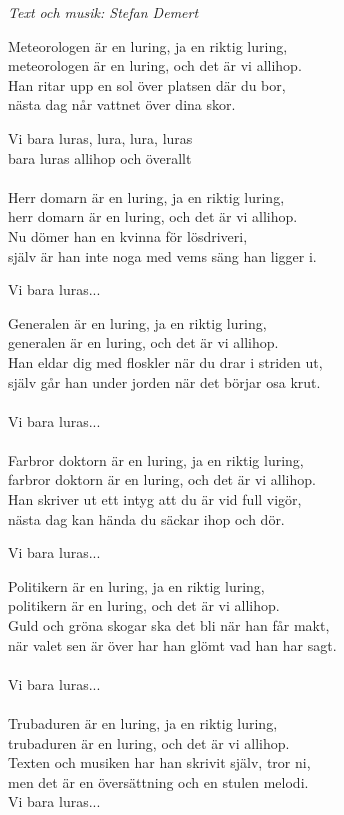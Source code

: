 {\footnotesize\textit{Text och musik: Stefan Demert}}\par
\vspace{10pt}
Meteorologen är en luring, ja en riktig luring,\\
meteorologen är en luring, och det är vi allihop.\\
Han ritar upp en sol över platsen där du bor,\\
nästa dag når vattnet över dina skor.\par
\vspace{10pt}
Vi bara luras, lura, lura, luras\\
bara luras allihop och överallt\\
\\
Herr domarn är en luring, ja en riktig luring,\\
herr domarn är en luring, och det är vi allihop.\\
Nu dömer han en kvinna för lösdriveri,\\
själv är han inte noga med vems säng han ligger i.\par
\vspace{10pt}
Vi bara luras...\par
\vspace{10pt}
Generalen är en luring, ja en riktig luring,\\
generalen är en luring, och det är vi allihop.\\
Han eldar dig med floskler när du drar i striden ut,\\
själv går han under jorden när det börjar osa krut.\\
\\
Vi bara luras...\\
\\
Farbror doktorn är en luring, ja en riktig luring,\\
farbror doktorn är en luring, och det är vi allihop.\\
Han skriver ut ett intyg att du är vid full vigör,\\
nästa dag kan hända du säckar ihop och dör.\par
\vspace{10pt}
Vi bara luras...\par
\vspace{10pt}
Politikern är en luring, ja en riktig luring,\\
politikern är en luring, och det är vi allihop.\\
Guld och gröna skogar ska det bli när han får makt,\\
när valet sen är över har han glömt vad han har sagt.\\
\\
Vi bara luras...\\
\\
Trubaduren är en luring, ja en riktig luring,\\
trubaduren är en luring, och det är vi allihop.\\
Texten och musiken har han skrivit själv, tror ni,\\
men det är en översättning och en stulen melodi.\\
Vi bara luras...
